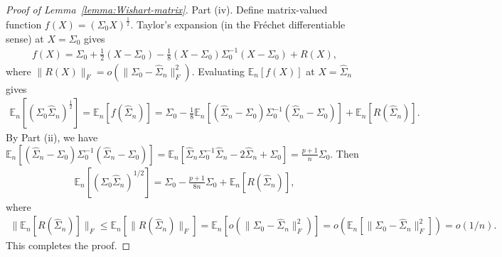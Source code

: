 \documentclass[11pt]{article}
\def\E {\mathbb{E}}
\newcommand{\half}{\frac{1}{2}}
\newcommand{\wh}{\widehat}
\begin{document}
\begin{proof}[Proof of Lemma~\ref{lemma:Wishart-matrix}]
     Part (iv). Define matrix-valued function $f(X) = (\Sigma_0 X)^{\half}$. Taylor's expansion (in the Fr\'echet differentiable sense) at $X = \Sigma_0$ gives
    \begin{align*}
        f(X) = \Sigma_0 + \frac{1}{2}(X-\Sigma_0) - \frac{1}{8}(X-\Sigma_0)\Sigma_0^{-1}(X-\Sigma_0) + R(X),
    \end{align*}
    where $\|R(X)\|_F=o(\|\Sigma_0-\wh\Sigma_n\|_F^2)$.
    Evaluating $\E_n [f(X)]$ at $X=\wh \Sigma_n$ gives
    \begin{align*}
        \E_n [(\Sigma_0\wh \Sigma_n)^{\half}] = \E_n [f(\wh\Sigma_n)] = \Sigma_0 - \frac{1}{8}\E_n \left[(\wh\Sigma_n-\Sigma_0)\Sigma_0^{-1}(\wh\Sigma_n-\Sigma_0)\right] + \E_n [R(\wh\Sigma_n)].
    \end{align*}
    By Part (ii), we have
    $
        \E_n \left[(\wh\Sigma_n-\Sigma_0)\Sigma_0^{-1}(\wh\Sigma_n-\Sigma_0)\right] =\E_n[\wh\Sigma_n \Sigma_0^{-1}\wh \Sigma_n- 2\wh\Sigma_n+\Sigma_0] = \frac{p+1}{n}\Sigma_0
    $.
    Then 
    \begin{align*}
        \E_n [(\Sigma_0\wh \Sigma_n)^{1/2}] = \Sigma_0 - \frac{p+1}{8n}\Sigma_0 + \E_n [R(\wh\Sigma_n)],
    \end{align*}
    where 
    \begin{align*}
        \|\E_n [R(\wh\Sigma_n)]\|_F\leq \E_n [\|R(\wh\Sigma_n)\|_F]=\E_n [o(\|\Sigma_0-\wh\Sigma_n\|_F^2)]=o(\E_n [\|\Sigma_0-\wh\Sigma_n\|_F^2]) = o(1/n).
    \end{align*}
    This completes the proof.
\end{proof}
\end{document}
